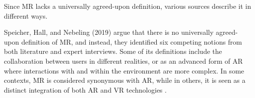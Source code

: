    
    Since \ac{MR} lacks a universally agreed-upon definition, various sources describe it in different ways. 

    Speicher, Hall, and Nebeling (2019) argue that there is no universally agreed-upon definition of \ac{MR}, and instead, they identified six competing notions from both literature and expert interviews.
    Some of its definitions include the collaboration between users in different realities, or as an advanced form of \ac{AR} where interactions with and within the environment are more complex. In some contexts, \ac{MR} is considered synonymous with \ac{AR}, while in others, it is seen as a distinct integration of both \ac{AR} and \ac{VR} technologies \cite{whatismixedreality}. 


